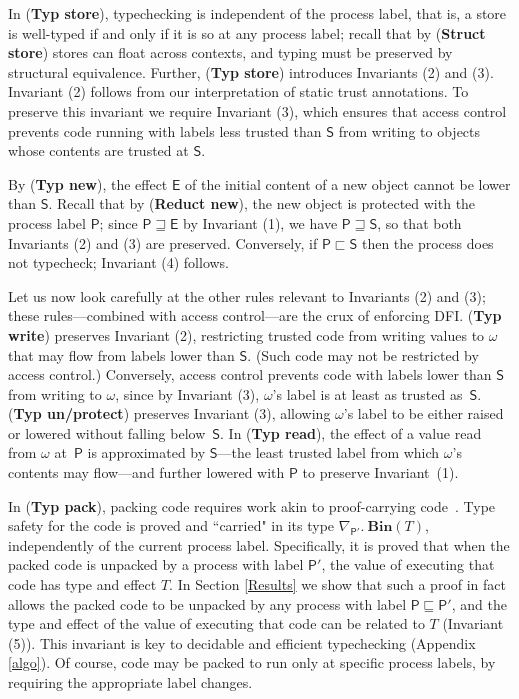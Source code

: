 \documentclass{sigplanconf}
\newcommand{\labp}{\mathsf P}
\newcommand{\labb}{\mathsf S}
\newcommand{\labt}{\mathsf E}
\newcommand{\trule}[1]{(\textbf{Typ #1})}
\newcommand{\srule}[1]{\textbf{Struct #1}}
\newcommand{\rrule}[1]{\textbf{Reduct #1}}
\begin{document}
In \trule{store}, typechecking is independent of the process label, that is, a store is well-typed if and only if it is so at any process label; recall that by (\srule{store}) stores can float across contexts, and typing must be preserved by structural equivalence. Further, \trule{store} introduces Invariants (2) and (3). Invariant (2) follows from our interpretation of static trust annotations. To preserve this invariant we require Invariant (3), which ensures that access control prevents code running with labels less trusted than $\labb$ from writing to objects whose contents are trusted at $\labb$. 

By \trule{new}, the effect $\labt$ of the initial content of a new object cannot be lower than $\labb$. Recall that by (\rrule{new}), the new object is protected with the process label $\labp$; since $\labp \sqsupseteq \labt$ by Invariant (1), we have $\labp \sqsupseteq \labb$, so that both Invariants (2) and (3) are preserved. Conversely, if $\labp \sqsubset \labb$ then the process does not typecheck; Invariant (4) follows. 

Let us now look carefully at the other rules relevant to Invariants (2) and (3); these rules---combined with access control---are the crux of enforcing DFI. 
\trule{write} preserves Invariant (2), restricting trusted code from writing values to $\omega$ that may flow from labels lower than $\labb$. (Such code may not be restricted by access control.) Conversely, access control prevents code with labels lower than $\labb$ from writing to $\omega$, since by Invariant (3), $\omega$'s label is at least as trusted as~$\labb$. 
\trule{un/protect} preserves Invariant (3), allowing $\omega$'s label to be either raised or lowered without falling below~$\labb$. 
In \trule{read}, the effect of a value read from $\omega$ at~$\labp$ is approximated by $\labb$---the least trusted
label from which $\omega$'s contents may flow---and further lowered with $\labp$ to preserve Invariant~(1). 


In \trule{pack}, packing code requires work akin to proof-carrying
code~\cite{pcc}. Type safety for the code is proved and ``carried" in its type
$\nabla_{\labp'}.~\mathbf{Bin}(T)$, independently of the current process label. Specifically, it is proved that when the packed code
is unpacked by a process with label $\labp'$, the value of executing that code has type and effect $T$. In Section \ref{Results} we show that such a proof in fact allows the packed code
to be unpacked by any process with label $\labp \sqsubseteq \labp'$, and the type and effect of the value of executing that code can be related to $T$ (Invariant (5)). 
This invariant is key to decidable and efficient typechecking (Appendix \ref{algo}). Of course, code may be packed to run only at specific process labels, by requiring the appropriate label changes.
\end{document}
